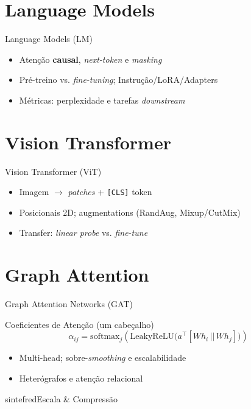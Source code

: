 \documentclass{beamer}
\begin{document}
\section{Language Models}
\begin{frame}{Language Models (LM)}
\begin{itemize}[<+->]
  \item Atenção \textbf{causal}, \textit{next-token} e \textit{masking}
  \item Pré-treino vs. \textit{fine-tuning}; Instrução/LoRA/Adapters
  \item Métricas: perplexidade e tarefas \textit{downstream}
\end{itemize}
\end{frame}

\section{Vision Transformer}
\begin{frame}{Vision Transformer (ViT)}
\begin{itemize}[<+->]
  \item Imagem $\rightarrow$ \textit{patches} + \texttt{[CLS]} token
  \item Posicionais 2D; augmentations (RandAug, Mixup/CutMix)
  \item Transfer: \textit{linear probe} vs. \textit{fine-tune}
\end{itemize}
\end{frame}

\section{Graph Attention}
\begin{frame}{Graph Attention Networks (GAT)}
\begin{block}{Coeficientes de Atenção (um cabeçalho)}
\small
\[
\alpha_{ij}=\mathrm{softmax}_j\!\left(\mathrm{LeakyReLU}\!\big(a^\top[Wh_i \,||\, Wh_j]\big)\right)
\]
\end{block}
\begin{itemize}[<+->]
  \item Multi-head; sobre-\textit{smoothing} e escalabilidade
  \item Heterógrafos e atenção relacional
\end{itemize}
\end{frame}

\begin{chapter}{sintefred}{Escala \& Compressão}\end{chapter}
\end{document}
